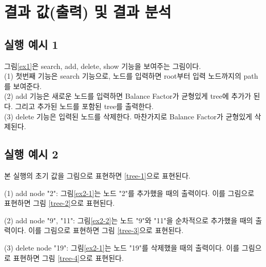 \documentclass{article}
\begin{document}
\section{결과 값(출력) 및 결과 분석}

\subsection{실행 예시 1}
그림\ref{ex1}은 search, add, delete, show 기능을 보여주는 그림이다. \\

(1) 첫번째 기능은 search 기능으로, 노드를 입력하면 root부터 입력 노드까지의 path를 보여준다. \\

(2) add 기능은 새로운 노드를 입력하면 Balance Factor가 균형있게 tree에 추가가 된다. 그리고 추가된 노드를 포함된 tree를 출력한다. \\

(3) delete 기능은 입력된 노드를 삭제한다. 마찬가지로 Balance Factor가 균형있게 삭제된다. \\

\subsection{실행 예시 2}
본 실행의 초기 값을 그림으로 표현하면 \ref{tree-1}으로 표현된다. 

(1) add node "2":
그림\ref{ex2-1}는 노드 "2"를 추가했을 때의 출력이다. 이를 그림으로 표현하면 그림 \ref{tree-2}으로 표현된다.

(2) add node "9", "11":
그림\ref{ex2-2}는 노드 "9"와 "11"을 순차적으로 추가했을 때의 출력이다. 이를 그림으로 표현하면 그림 \ref{tree-3}으로 표현된다.

(3) delete node "19":
그림\ref{ex2-1}는 노드 "19"를 삭제했을 때의 출력이다. 이를 그림으로 표현하면 그림 \ref{tree-4}으로 표현된다.
\end{document}
